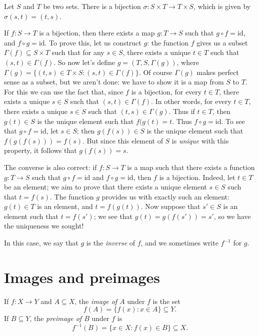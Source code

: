 \documentclass[11pt,dvipsnames]{book}
\numberwithin{figure}{section} %
\numberwithin{table}{section} %
\begin{document}
\begin{example}
	Let $S$ and $T$ be two sets.
	There is a bijection $ \sigma \colon S \times T \to T \times S $, which is given by $\sigma(s,t) = (t,s)$.
\end{example}

If $ f \colon S \to T $ is a bijection, then there exists a map $ g \colon T \to S $ such that $g \circ f = \mathrm{id} $, and $f \circ g = \mathrm{id}$.
To prove this, let us construct $g$:
the function $f $ gives us a subset $\Gamma(f) \subseteq S \times T$ such that for any $s \in S$, there exists a unique $ t \in T$ such that $(s, t) \in \Gamma(f)$.
So now let's define $g = (T, S, \Gamma(g))$, where $\Gamma(g) = \{ (t,s) \in T \times S : (s, t) \in \Gamma(f) \}$.
Of course $\Gamma(g)$ makes perfect sense as a subset, but we aren't done:
we have to show it is a map from $S$ to $T$.
For this we can use the fact that, since $f$ is a bijection, for every $t \in T$, there exists a unique $s \in S $ such that $(s,t) \in \Gamma(f)$.
In other words, for every $t \in T$, there exists a unique $s \in S $ such that $(t,s) \in \Gamma(g)$.
Thus if $t \in T$, then $g(t) \in S$ is the unique element such that $f(g(t) = t$.
Thus $f \circ g = \mathrm{id}$.
To see that $g \circ f = \mathrm{id}$, let $ s \in S$;
then $g(f(s)) \in S$ is the unique element such that $f(g(f(s))) = f(s)$.
But since this element of $S$ is \emph{unique} with this property, it follows that $g(f(s)) = s $.

The converse is also correct: if $f \colon S \to T$ is a map such that there exists a function $g \colon T \to S $ such that $g \circ f =\mathrm{id} $ and $f \circ g = \mathrm{id}$, then $f$ is a bijection.
Indeed, let $t \in T$ be an element;
we aim to prove that there exists a unique element $ s \in S$ such that $t = f(s)$.
The function $g$ provides us with exactly such an element: $g(t) \in T$ is an element, and $t = f(g(t))$.
Now suppose that $s'\in S$ is an element such that $t = f(s')$;
we see that $g(t) = g(f(s')) = s'$, so we have the uniqueness we sought!

In this case, we say that $g$ is the \emph{inverse} of $f$, and we sometimes write $f^{-1}$ for $g$.

\section{Images and preimages}%
\label{imagesandpreimages}

\begin{definition}
If $f\colon X\rightarrow Y$ and $A\subseteq X$,  the  \emph{image of $A$} under $f$ is  the set
\[
  f(A)=\{f(x):x\in A\} \subseteq Y.
\]
If $B\subseteq Y$, the  \emph{preimage of $B$} under $f$ is
\[
f^{-1}(B)=\{x\in X: f(x)\in B\} \subseteq X.
\]
\end{definition}
\end{document}
